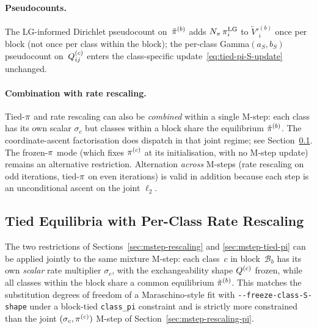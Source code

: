 \paragraph{Pseudocounts.}
The LG-informed Dirichlet pseudocount on~$\tilde{\pi}^{(b)}$ adds
$N_\pi\,\pi^{\mathrm{LG}}_i$ to $\tilde V'^{(b)}_i$ once per block
(not once per class within the block); the per-class
Gamma$(a_S, b_S)$ pseudocount on~$Q^{(c)}_{ij}$ enters the
class-specific update~\eqref{eq:tied-pi-S-update} unchanged.

\paragraph{Combination with rate rescaling.}
Tied-$\pi$ and rate rescaling can also be \emph{combined} within a
single M-step: each class has its own scalar $\sigma_c$ but classes
within a block share the equilibrium $\tilde{\pi}^{(b)}$.  The
coordinate-ascent factorisation does dispatch in that joint regime;
see Section~\ref{sec:mstep-tied-pi-rescaling}.  The frozen-$\pi$
mode (which fixes $\pi^{(c)}$ at its initialisation, with no M-step
update) remains an alternative restriction.  Alternation
\emph{across} M-steps (rate rescaling on odd iterations, tied-$\pi$
on even iterations) is valid in addition because each step is an
unconditional ascent on the joint $\ell_2$.


\subsection{Tied Equilibria with Per-Class Rate Rescaling}
\label{sec:mstep-tied-pi-rescaling}

The two restrictions of Sections~\ref{sec:mstep-rescaling} and
\ref{sec:mstep-tied-pi} can be applied jointly to the same mixture
M-step: each class~$c$ in block~$\mathcal{B}_b$ has its own
\emph{scalar} rate multiplier $\sigma_c$, with the exchangeability
shape $Q^{(c)}$ frozen, while all classes within the block share
a common equilibrium $\tilde{\pi}^{(b)}$.  This matches the
substitution degrees of freedom of a Maraschino-style fit with
\verb|--freeze-class-S-shape| under a block-tied
\verb|class_pi| constraint and is strictly more constrained than the
joint $(\sigma_c, \pi^{(c)})$ M-step of
Section~\ref{sec:mstep-rescaling-pi}.

